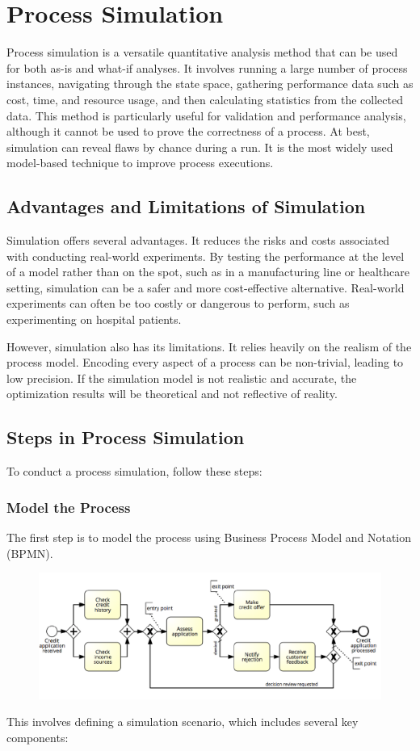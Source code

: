 \chapter{Process Simulation}

Process simulation is a versatile quantitative analysis method that can be used for both as-is and what-if analyses. It involves running a large number of process instances, navigating through the state space, gathering performance data such as cost, time, and resource usage, and then calculating statistics from the collected data. This method is particularly useful for validation and performance analysis, although it cannot be used to prove the correctness of a process. At best, simulation can reveal flaws by chance during a run. It is the most widely used model-based technique to improve process executions.

\section{Advantages and Limitations of Simulation}

Simulation offers several advantages. It reduces the risks and costs associated with conducting real-world experiments. By testing the performance at the level of a model rather than on the spot, such as in a manufacturing line or healthcare setting, simulation can be a safer and more cost-effective alternative. Real-world experiments can often be too costly or dangerous to perform, such as experimenting on hospital patients.

However, simulation also has its limitations. It relies heavily on the realism of the process model. Encoding every aspect of a process can be non-trivial, leading to low precision. If the simulation model is not realistic and accurate, the optimization results will be theoretical and not reflective of reality.

\section{Steps in Process Simulation}

To conduct a process simulation, follow these steps:

\subsection{Model the Process}

The first step is to model the process using Business Process Model and Notation (BPMN). 
\begin{figure}[h!]
    \centering
    \includegraphics[width=0.75\linewidth]{capitolo 10/1.png}
\end{figure}
This involves defining a simulation scenario, which includes several key components:

